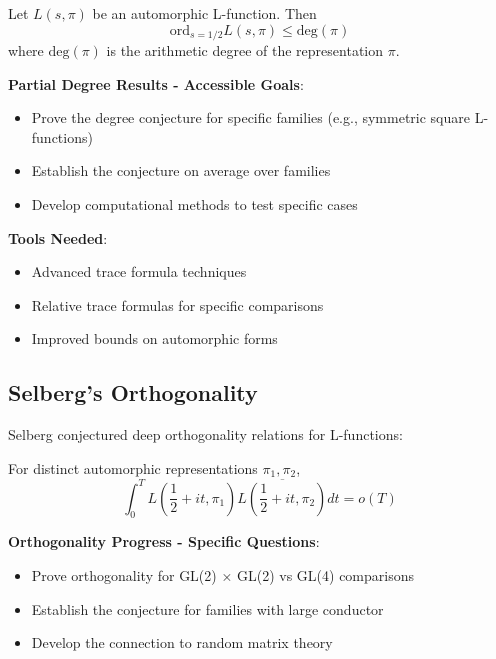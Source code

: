 \begin{conjecture}
Let $L(s, \pi)$ be an automorphic L-function. Then
\begin{equation}
\text{ord}_{s=1/2} L(s, \pi) \leq \text{deg}(\pi)
\end{equation}
where $\text{deg}(\pi)$ is the arithmetic degree of the representation $\pi$.
\end{conjecture}

\noindent\textbf{Partial Degree Results - Accessible Goals}:
\begin{itemize}
\item Prove the degree conjecture for specific families (e.g., symmetric square L-functions)
\item Establish the conjecture on average over families
\item Develop computational methods to test specific cases
\end{itemize}

\textbf{Tools Needed}:
\begin{itemize}
\item Advanced trace formula techniques
\item Relative trace formulas for specific comparisons
\item Improved bounds on automorphic forms
\end{itemize}

\subsection{Selberg's Orthogonality}
\label{subsec:selberg_orthogonality}

Selberg conjectured deep orthogonality relations for L-functions:

\begin{conjecture}
For distinct automorphic representations $\pi_1, \pi_2$,
\begin{equation}
\int_0^T L\left(\frac{1}{2} + it, \pi_1\right) \overline{L\left(\frac{1}{2} + it, \pi_2\right)} dt = o(T)
\end{equation}
\end{conjecture}

\noindent\textbf{Orthogonality Progress - Specific Questions}:
\begin{itemize}
\item Prove orthogonality for GL(2) × GL(2) vs GL(4) comparisons
\item Establish the conjecture for families with large conductor
\item Develop the connection to random matrix theory
\end{itemize}

